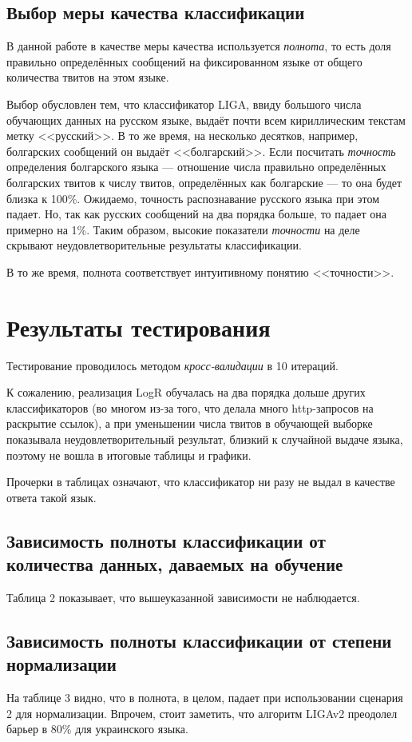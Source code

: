 \documentclass[a4paper, 14pt]{article}
\begin{document}
		\subsection{Выбор меры качества классификации}
		В данной работе в качестве меры качества используется \textit{полнота}, то есть доля правильно определённых сообщений на фиксированном языке
		от общего количества твитов на этом языке.
		
		Выбор обусловлен тем, что классификатор LIGA, ввиду большого числа обучающих данных на русском языке,
		выдаёт почти всем кириллическим текстам метку <<русский>>. В то же время, на несколько десятков, например, болгарских сообщений он выдаёт 
		<<болгарский>>. Если посчитать \textit{точность} определения болгарского языка --- отношение числа правильно определённых болгарских твитов 
		к числу твитов, определённых как болгарские --- то она будет близка к 100\%. Ожидаемо, точность распознавание русского языка при этом падает.
		Но, так как русских сообщений на два порядка больше, то падает она примерно на 1\%. Таким образом, высокие показатели \textit{точности} на деле
		скрывают неудовлетворительные результаты классификации.
		
		В то же время, полнота соответствует интуитивному понятию <<точности>>.
       
\section{Результаты тестирования}
		Тестирование проводилось методом \textit{кросс-валидации} в 10 итераций.
		
		К сожалению, реализация LogR обучалась на два порядка дольше других классификаторов (во многом из-за того, что делала много http-запросов
		на раскрытие ссылок), а при уменьшении числа твитов в обучающей выборке показывала неудовлетворительный результат, близкий к случайной
		выдаче языка, поэтому не вошла в итоговые таблицы и графики.
		
		Прочерки в таблицах означают, что классификатор ни разу не выдал в качестве ответа такой язык.
		
		\subsection{Зависимость полноты классификации от количества данных, даваемых на обучение}
		Таблица 2 показывает, что вышеуказанной зависимости не наблюдается.
		
		\subsection{Зависимость полноты классификации от степени нормализации}
		На таблице 3 видно, что в полнота, в целом, падает при использовании сценария 2 для нормализации. Впрочем, 
		стоит заметить, что алгоритм LIGAv2 преодолел барьер в 80\% для украинского языка.
\end{document}

